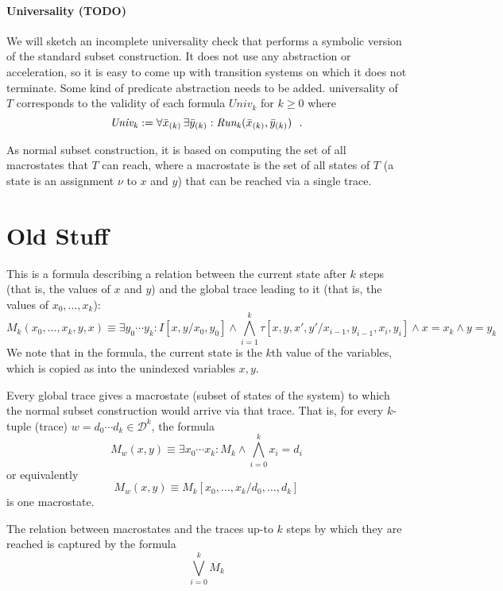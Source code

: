 \documentclass[10pt]{llncs}
\newcommand{\Universal}[1]{\mathit{Univ_{#1}}}
\newcommand{\Run}[1]{\mathit{Run_{#1}}}
\newcommand{\viz}{x}
\newcommand{\inviz}{y}
\newcommand{\domain}{\mathcal {D}}
\newcommand{\dvalue}{d}
\newcommand{\transition}{\tau}
\newcommand{\fdef}{\mathrel{:=}}
\begin{document}
\paragraph{Universality (TODO)}
We will sketch an incomplete universality check that performs a symbolic version of the standard subset construction. It does not use any abstraction or acceleration, so it is easy to come up with transition systems on which it does not terminate. Some kind of predicate abstraction needs to be added. 
universality of $T$ corresponds to the validity of each formula $\Universal k$ for $k\geq 0$ where
$$
\Universal k \fdef
\forall \vect x[k]\, \exists \vect y[k]:\Run k(\vect x[k],\vect y[k]) \ \ .
$$

As normal subset construction, it is based on computing the set of all macrostates that $T$ can reach,
where a macrostate is the set of all states  of $T$ (a state is an assignment $\nu$ to $x$ and $y$) that can be reached via a single trace.
%



\newpage
\section{Old Stuff}
This is a formula describing a relation between the current state after $k$ steps (that is, the values of $\viz$ and $\inviz$) and the global trace leading to it (that is, the values of $\viz_0,\ldots,\viz_k$):
$$
M_k(\viz_0,\ldots,\viz_k,\inviz,\viz) \equiv \exists \inviz_0\cdots \inviz_{k}:  I[x,y/x_0,y_0] \land \bigwedge_{i=1}^k \transition[\viz,\inviz,\viz',\inviz'/\viz_{i-1},\inviz_{i-1},\viz_i,\inviz_i] \land \viz = \viz_k \land \inviz = \inviz_k 
$$
We note that in the formula, the current state is the $k$th value of the variables, which is copied as into the unindexed variables $x,y$.  

Every global trace gives a macrostate (subset of states of the system) to which the normal subset construction would arrive via that trace.
That is, for every $k$-tuple (trace) $w = \dvalue_0\cdots\dvalue_k \in \domain^k$, the formula 
$$M_{w}(\viz,\inviz) \equiv \exists \viz_0\cdots \viz_{k}: M_k \land \bigwedge_{i=0}^k{\viz_i = \dvalue_i}$$ 
or equivalently
$$M_{w}(\viz,\inviz) \equiv M_k [\viz_0,\ldots,\viz_k/\dvalue_0,\ldots,\dvalue_k] $$ 
is one macrostate. 

The relation between macrostates and the traces up-to $k$ steps by which they are reached is captured by the formula  
$$\bigvee_{i=0}^k M_k$$
\end{document}
